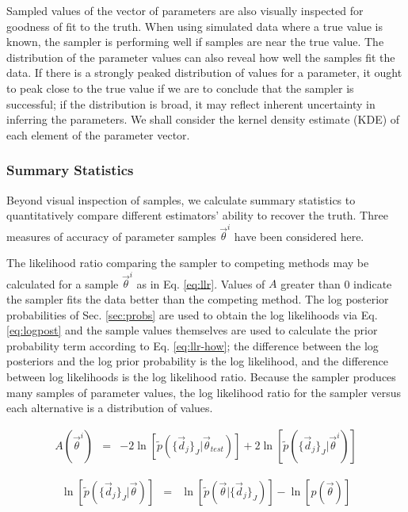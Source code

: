 \documentclass[preprint]{aastex}
\begin{document}
Sampled values of the vector of parameters are also visually inspected for 
goodness of fit to the truth.  When using simulated data where a true value is 
known, the sampler is performing well if samples are near the true value.  The 
distribution of the parameter values can also reveal how well the samples fit 
the data.  If there is a strongly peaked distribution of values for a 
parameter, it ought to peak close to the true value if we are to conclude that 
the sampler is successful; if the distribution is broad, it may reflect 
inherent uncertainty in inferring the parameters.  We shall consider the kernel 
density estimate (KDE) of each element of the parameter vector.

\clearpage
\subsubsection{Summary Statistics}
\label{sec:stats}

Beyond visual inspection of samples, we calculate summary statistics to 
quantitatively compare different estimators' ability to recover the truth.  
Three measures of accuracy of parameter samples $\vec{\theta}^{i}$  have been 
considered here.  

The likelihood ratio comparing the sampler to competing methods may be 
calculated for a sample $\vec{\theta}^{i}$ as in Eq. \ref{eq:llr}.  Values of 
$A$ greater than 0 indicate the sampler fits the data better than the competing 
method.  The log posterior probabilities of Sec. \ref{sec:probs} are used to 
obtain the log likelihoods via Eq. \ref{eq:logpost} and the sample values 
themselves are used to calculate the prior probability term according to Eq. 
\ref{eq:llr-how}; the difference between the log posteriors and the log prior 
probability is the log likelihood, and the difference between log likelihoods 
is the log likelihood ratio.  Because the sampler produces many samples of 
parameter values, the log likelihood ratio for the sampler versus each 
alternative is a distribution of values.

\begin{eqnarray}
\label{eq:llr}
A(\vec{\theta}^{i}) &=& 
-2\ln[\tilde{p}(\{\vec{d}_{j}\}_{J}|\vec{\theta}_{test})]+2\ln[\tilde{p}(\{\vec{
d}_{j}\}_{J}|\vec{\theta}^{i})]
\end{eqnarray}

\begin{eqnarray}
\label{eq:llr-how}
\ln[\tilde{p}(\{\vec{d}_{j}\}_{J}|\vec{\theta})] &=& 
\ln[\tilde{p}(\vec{\theta}|\{\vec{d}_{j}\}_{J})]-\ln[p(\vec{\theta})]
\end{eqnarray}
\end{document}
